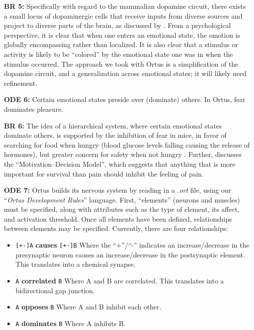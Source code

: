 \documentclass[letterpaper]{article}
\begin{document}
\textbf{BR 5:} Specifically with regard to the mammalian dopamine circuit, there exists a small locus of dopaminergic cells that receive inputs from diverse sources and project to diverse parts of the brain, as discussed by \citet{Beier2015}. From a psychological perspective, it is clear that when one enters an emotional state, the emotion is globally encompassing rather than localized. It is also clear that a stimulus or activity is likely to be ``colored'' by the emotional state one was in when the stimulus occurred. The approach we took with Ortus is a simplification of the dopamine circuit, and a generalization across emotional states; it will likely need refinement.

\textbf{ODE 6:} Certain emotional states preside over (dominate) others. In Ortus, fear dominates pleasure.

\textbf{BR 6:} The idea of a hierarchical system, where certain emotional states dominate others, is supported by the inhibition of fear in mice, in favor of searching for food when hungry (blood glucose levels falling causing the release of hormones), but greater concern for safety when not hungry \citep{Verma2015}. Further, \citet{Leknes2008} discusses the ``Motivation--Decision Model'', which suggests that anything that is more important for survival than pain should inhibit the feeling of pain.


\textbf{ODE 7:} Ortus builds its nervous system by reading in a \textit{.ort} file, using our ``\textit{Ortus Development Rules}'' language. First, ``elements'' (neurons and muscles) must be specified, along with attributes such as the type of element, its affect, and activation threshold. Once all elements have been defined, relationships between elements may be specified. Currently, there are four relationships:
\begin{itemize}
    \itemsep0em
    \item \texttt{[+-]A} \textbf{causes} \texttt{[+-]B}
        \subitem Where the ``+''/``-'' indicates an increase/decrease in the presynaptic neuron causes an increase/decrease in the postsynaptic element. This translates into a chemical synapse.
    \item \texttt{A} \textbf{correlated} \texttt{B}
        \subitem Where A and B are correlated. This translates into a bidirectional gap junction.
    \item \texttt{A} \textbf{opposes} \texttt{B}
        \subitem Where A and B inhibit each other.
     \item \texttt{A} \textbf{dominates} \texttt{B}
         \subitem Where A inhibits B.
\end{itemize}
\end{document}
